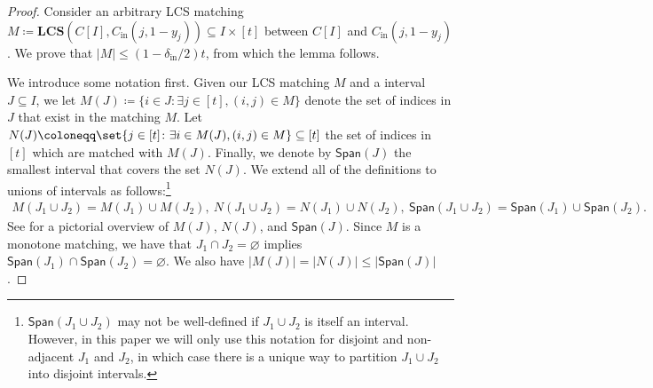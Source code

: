 \documentclass[10pt,a4paper]{article}
\theoremstyle{remark}
\newcommand{\tuple}[1]{\ensuremath{\left(#1\right)}}
\newcommand{\tp}{\tuple}
\newcommand{\authnote}[3]{\textcolor{#2}{{\sf (#1's Note: {\sl{#3}})}}}
\newcommand{\knote}{\authnote{Kuan}{cyan}}
\newcommand{\alex}[1]{\authnote{Alex}{orange}{#1}}
\newcommand{\authnote}{}
\newcommand{\knote}[1]{}
\newcommand{\alex}[1]{}
\newcommand{\Cin}{C_{\text{in}}}
\newcommand{\din}{\delta_{\text{in}}}
\newcommand{\LCS}{\ensuremath{\mathbf{LCS}}\xspace}
\newcommand{\Span}{\textsf{Span}}
\begin{document}
\begin{proof}
Consider an arbitrary LCS matching $M \coloneqq \LCS(C[I], \Cin\tp{j, 1-y_j})  \subseteq I \times [t]$ between $C[I]$ and $\Cin\tp{j,1-y_j}$. 
We prove that $|M| \le (1-\din/2)t$, from which the lemma follows. 

We introduce some notation first.
Given our LCS matching $M$ and a interval $J \subseteq I$, we let $M(J) \coloneqq \{ i \in J \colon \exists j \in [t], (i,j) \in M\}$ denote the set of indices in $J$ that exist in the matching $M$. 
Let $N(J) \coloneqq \set{j \in [t] \colon \exists i \in M(J), (i,j) \in M} \subseteq [t]$ the set of indices in $[t]$ which are matched with $M(J)$. 
Finally, we denote by $\textsf{Span}(J)$ the smallest interval that covers the set $N(J)$. 
We extend all of the definitions to unions of intervals as follows:\footnote{$\textsf{Span}(J_1\cup J_2)$ may not be well-defined if $J_1\cup J_2$ is itself an interval. However, in this paper we will only use this notation for disjoint and non-adjacent $J_1$ and $J_2$, in which case there is a unique way to partition $J_1 \cup J_2$ into disjoint intervals.}
\begin{align*}
	M(J_1 \cup J_2) = M(J_1) \cup M(J_2), \ N(J_1 \cup J_2) = N(J_1) \cup N(J_2), \ \textsf{Span}(J_1 \cup J_2) = \textsf{Span}(J_1) \cup \textsf{Span}(J_2).
\end{align*}
See  for a pictorial overview of $M(J)$, $N(J)$, and $\Span(J)$.
Since $M$ is a monotone matching, we have that $J_1 \cap J_2 = \varnothing$ implies $\Span(J_1) \cap \Span(J_2) = \varnothing$.
We also have $|M(J)|=|N(J)|\le|\textsf{Span}(J)|$.


\end{proof}
\end{document}
